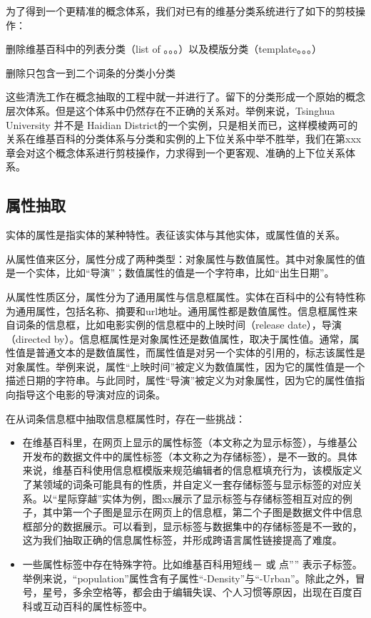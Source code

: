 为了得到一个更精准的概念体系，我们对已有的维基分类系统进行了如下的剪枝操作：

删除维基百科中的列表分类（list of 。。。）以及模版分类（template。。。）

删除只包含一到二个词条的分类小分类

这些清洗工作在概念抽取的工程中就一并进行了。留下的分类形成一个原始的概念层次体系。但是这个体系中仍然存在不正确的关系对。举例来说，Tsinghua University 并不是 Haidian District的一个实例，只是相关而已，这样模棱两可的关系在维基百科的分类体系与分类和实例的上下位关系中举不胜举，我们在第xxx章会对这个概念体系进行剪枝操作，力求得到一个更客观、准确的上下位关系体系。

\subsection{属性抽取}

实体的属性是指实体的某种特性。表征该实体与其他实体，或属性值的关系。

从属性值来区分，属性分成了两种类型：对象属性与数值属性。其中对象属性的值是一个实体，比如“导演”；数值属性的值是一个字符串，比如“出生日期”。

从属性性质区分，属性分为了通用属性与信息框属性。实体在百科中的公有特性称为通用属性，包括名称、摘要和url地址。通用属性都是数值属性。信息框属性来自词条的信息框，比如电影实例的信息框中的上映时间（release date），导演（directed by）。信息框属性是对象属性还是数值属性，取决于属性值。通常，属性值是普通文本的是数值属性，而属性值是对另一个实体的引用的，标志该属性是对象属性。举例来说，属性“上映时间”被定义为数值属性，因为它的属性值是一个描述日期的字符串。与此同时，属性“导演”被定义为对象属性，因为它的属性值指向指导这个电影的导演对应的词条。

在从词条信息框中抽取信息框属性时，存在一些挑战：

\begin{itemize}
\item 在维基百科里，在网页上显示的属性标签（本文称之为显示标签），与维基公开发布的数据文件中的属性标签（本文称之为存储标签），是不一致的。具体来说，维基百科使用信息框模版来规范编辑者的信息框填充行为，该模版定义了某领域的词条可能具有的性质，并自定义一套存储标签与显示标签的对应关系。以“星际穿越”实体为例，图xx展示了显示标签与存储标签相互对应的例子，其中第一个子图是显示在网页上的信息框，第二个子图是数据文件中信息框部分的数据展示。可以看到，显示标签与数据集中的存储标签是不一致的，这为我们抽取正确的信息属性标签，并形成跨语言属性链接提高了难度。
\item 一些属性标签中存在特殊字符。比如维基百科用短线－ 或 点”” 表示子标签。举例来说，“population”属性含有子属性“-Density”与“-Urban”。除此之外，冒号，星号，多余空格等，都会由于编辑失误、个人习惯等原因，出现在百度百科或互动百科的属性标签中。
\end{itemize}

